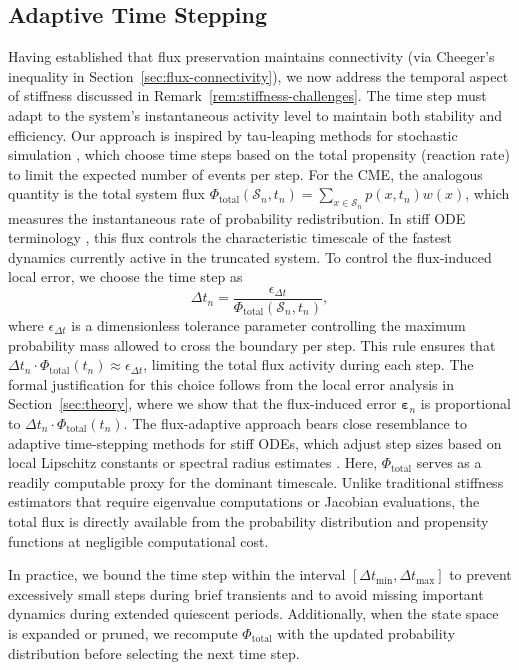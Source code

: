 \documentclass[review,onefignum,onetabnum]{siamart171218}
\begin{document}
\subsection{Adaptive Time Stepping}

Having established that flux preservation maintains connectivity (via Cheeger's inequality in Section~\ref{sec:flux-connectivity}), we now address the temporal aspect of stiffness discussed in Remark~\ref{rem:stiffness-challenges}. The time step must adapt to the system's instantaneous activity level to maintain both stability and efficiency. Our approach is inspired by tau-leaping methods for stochastic simulation \cite{gillespie2001approximate,cao2006efficient      }, which choose time steps based on the total propensity (reaction rate) to limit the expected number of events per step. For the CME, the analogous quantity is the total system flux $\Phi_{\mathrm{total}}(\mathcal{S}_n, t_n) = \sum_{x \in \mathcal{S}_n} p(x, t_n) w(x)$, which measures the instantaneous rate of probability redistribution. In stiff ODE terminology \cite{Hairer1996}, this flux controls the characteristic timescale of the fastest dynamics currently active in the truncated system. To control the flux-induced local error, we choose the time step as
\begin{equation}
\label{eq:flux-timestep}
\Delta t_n = \frac{\epsilon_{\Delta t}}{\Phi_{\mathrm{total}}(\mathcal{S}_n, t_n)},
\end{equation}
where $\epsilon_{\Delta t}$ is a dimensionless tolerance parameter controlling the maximum probability mass allowed to cross the boundary per step. This rule ensures that $\Delta t_n \cdot \Phi_{\mathrm{total}}(t_n) \approx \epsilon_{\Delta t}$, limiting the total flux activity during each step. The formal justification for this choice follows from the local error analysis in Section~\ref{sec:theory}, where we show that the flux-induced error $\boldsymbol{\varepsilon}_n$ is proportional to $\Delta t_n \cdot \Phi_{\mathrm{total}}(t_n)$. The flux-adaptive approach bears close resemblance to adaptive time-stepping methods for stiff ODEs, which adjust step sizes based on local Lipschitz constants or spectral radius estimates \cite{Hairer1996,Shampine1997}. Here, $\Phi_{\mathrm{total}}$ serves as a readily computable proxy for the dominant timescale. Unlike traditional stiffness estimators that require eigenvalue computations or Jacobian evaluations, the total flux is directly available from the probability distribution and propensity functions at negligible computational cost. 
\begin{remark}
    In practice, we bound the time step within the interval $[\Delta t_{\min}, \Delta t_{\max}]$ to prevent excessively small steps during brief transients and to avoid missing important dynamics during extended quiescent periods. Additionally, when the state space is expanded or pruned, we recompute $\Phi_{\mathrm{total}}$ with the updated probability distribution before selecting the next time step.
\end{remark}
\end{document}
